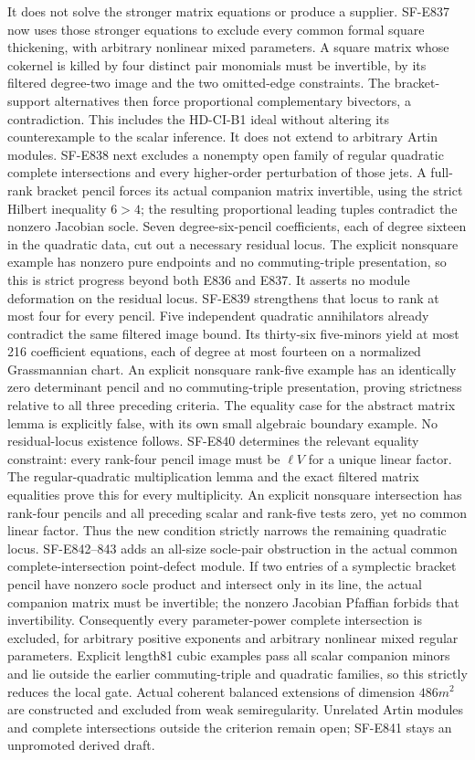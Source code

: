 \documentclass[11pt]{article}
\theoremstyle{remark}\newtheorem{remark}[theorem]{Remark}
\begin{document}
It does not solve the stronger matrix equations or produce a supplier.
SF-E837 now uses those stronger equations to exclude every common
formal square thickening, with arbitrary nonlinear mixed parameters.
A square matrix whose cokernel is killed by four distinct pair
monomials must be invertible, by its filtered degree-two image and
the two omitted-edge constraints. The bracket-support alternatives
then force proportional complementary bivectors, a contradiction.
This includes the HD-CI-B1 ideal without altering its counterexample
to the scalar inference. It does not extend to arbitrary Artin modules.
SF-E838 next excludes a nonempty open family of regular quadratic
complete intersections and every higher-order perturbation of those
jets. A full-rank bracket pencil forces its actual companion matrix
invertible, using the strict Hilbert inequality $6>4$; the resulting
proportional leading tuples contradict the nonzero Jacobian socle.
Seven degree-six-pencil coefficients, each of degree sixteen in the
quadratic data, cut out a necessary residual locus. The explicit
nonsquare example has nonzero pure endpoints and no commuting-triple
presentation, so this is strict progress beyond both E836 and E837.
It asserts no module deformation on the residual locus.
SF-E839 strengthens that locus to rank at most four for every pencil.
Five independent quadratic annihilators already contradict the same
filtered image bound. Its thirty-six five-minors yield at most 216
coefficient equations, each of degree at most fourteen on a normalized
Grassmannian chart. An explicit nonsquare rank-five example has an
identically zero determinant pencil and no commuting-triple presentation,
proving strictness relative to all three preceding criteria. The equality
case for the abstract matrix lemma is explicitly false, with its own
small algebraic boundary example. No residual-locus existence follows.
SF-E840 determines the relevant equality constraint: every rank-four
pencil image must be $\ell V$ for a unique linear factor. The
regular-quadratic multiplication lemma and the exact filtered matrix
equalities prove this for every multiplicity. An explicit nonsquare
intersection has rank-four pencils and all preceding scalar and
rank-five tests zero, yet no common linear factor. Thus the new
condition strictly narrows the remaining quadratic locus.
SF-E842--843 adds an all-size socle-pair obstruction in the actual
common complete-intersection point-defect module. If two entries of
a symplectic bracket pencil have nonzero socle product and intersect
only in its line, the actual companion matrix must be invertible;
the nonzero Jacobian Pfaffian forbids that invertibility.
Consequently every parameter-power complete intersection is excluded,
for arbitrary positive exponents and arbitrary nonlinear mixed regular
parameters. Explicit length81 cubic examples pass all scalar companion
minors and lie outside the earlier commuting-triple and quadratic
families, so this strictly reduces the local gate. Actual coherent
balanced extensions of dimension $486m^2$ are constructed and excluded
from weak semiregularity. Unrelated Artin modules and complete
intersections outside the criterion remain open; SF-E841 stays an
unpromoted derived draft.
\end{document}
